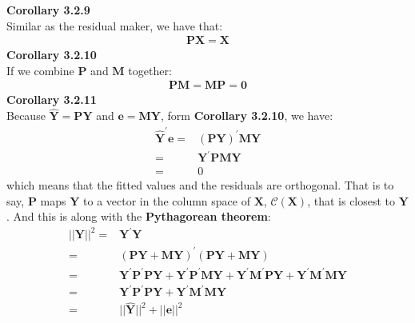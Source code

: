 \documentclass{article}
\begin{document}
\textbf{Corollary 3.2.9}\\
Similar as the residual maker, we have that:
	\begin{align*}
		\boldsymbol{P} \boldsymbol{X} = \boldsymbol{X}
	\end{align*}
\textbf{Corollary 3.2.10}\\
If we combine $\boldsymbol{P}$ and $\boldsymbol{M}$ together:
	\begin{align*}
		\boldsymbol{P} \boldsymbol{M} = \boldsymbol{M} \boldsymbol{P} = \boldsymbol{0}
	\end{align*}
\textbf{Corollary 3.2.11}\\
Because $\hat{\boldsymbol{Y}} = \boldsymbol{P} \boldsymbol{Y}$ and $\boldsymbol{e} = \boldsymbol{M} \boldsymbol{Y}$, form \textbf{Corollary 3.2.10}, we have:
	\begin{align*}
		\hat{\boldsymbol{Y}}^\prime \boldsymbol{e} = &(\boldsymbol{P} \boldsymbol{Y})^\prime \boldsymbol{M} \boldsymbol{Y}\\
		= &\boldsymbol{Y}^\prime \boldsymbol{P} \boldsymbol{M} \boldsymbol{Y}\\
		= &0 
	\end{align*}
which means that the fitted values and the residuals are orthogonal. That is to say, $\boldsymbol{P}$ maps $\boldsymbol{Y}$ to a vector in the column space of $\boldsymbol{X}$, $\mathscr{C}(\boldsymbol{X})$, that is closest to $\boldsymbol{Y}$. And this is along with the \textbf{Pythagorean theorem}:
	\begin{align*}
		||\boldsymbol{Y}||^2 = &\boldsymbol{Y}^\prime\boldsymbol{Y}\\
		= &(\boldsymbol{P}\boldsymbol{Y} + \boldsymbol{M}\boldsymbol{Y})^\prime(\boldsymbol{P}\boldsymbol{Y} + \boldsymbol{M}\boldsymbol{Y})\\
		= &\boldsymbol{Y}^\prime\boldsymbol{P}^\prime\boldsymbol{P}\boldsymbol{Y} + \boldsymbol{Y}^\prime\boldsymbol{P}^\prime\boldsymbol{M}\boldsymbol{Y} + \boldsymbol{Y}^\prime\boldsymbol{M}^\prime\boldsymbol{P}\boldsymbol{Y} + \boldsymbol{Y}^\prime\boldsymbol{M}^\prime\boldsymbol{M}\boldsymbol{Y}\\
		= &\boldsymbol{Y}^\prime\boldsymbol{P}^\prime\boldsymbol{P}\boldsymbol{Y} + \boldsymbol{Y}^\prime\boldsymbol{M}^\prime\boldsymbol{M}\boldsymbol{Y}\\
		= &||\hat{\boldsymbol{Y}}||^2 + ||\boldsymbol{e}||^2
	\end{align*}
\end{document}
